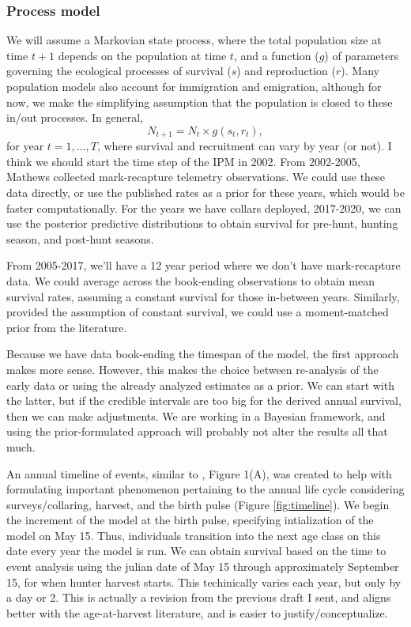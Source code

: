 \documentclass[12pt]{article}\usepackage[]{graphicx}\usepackage[]{color}
\begin{document}
\subsubsection{Process model}
We will assume a Markovian state process, where the total population size at time $t+1$ depends on the population at time $t$, and a function ($g$) of parameters governing the ecological processes of survival ($s$) and reproduction ($r$). Many population models also account for immigration and emigration, although for now, we make the simplifying assumption that the population is closed to these in/out processes. In general,
\begin{equation}
N_{t+1} = N_t \times g(s_t,r_t),
\end{equation} 
\noindent for year $t = 1,...,T$, where survival and recruitment can vary by year (or not). I think we should start the time step of the IPM in 2002. From 2002-2005, Mathews collected mark-recapture telemetry observations. We could use these data directly, or use the published rates as a prior for these years, which would be faster computationally. For the years we have collars deployed, 2017-2020, we can use the posterior predictive distributions to obtain survival for pre-hunt, hunting season, and post-hunt seasons. 

From 2005-2017, we'll have a 12 year period where we don't have mark-recapture data. We could average across the book-ending observations to obtain mean survival rates, assuming a constant survival for those in-between years. Similarly, provided the assumption of constant survival, we could use a moment-matched prior from the literature. 

Because we have data book-ending the timespan of the model, the first approach makes more sense. However, this makes the choice between re-analysis of the early data or using the already analyzed estimates as a prior. We can start with the latter, but if the credible intervals are too big for the derived annual survival, then we can make adjustments. We are working in a Bayesian framework, and using the prior-formulated approach will probably not alter the results all that much.

An annual timeline of events, similar to \citet{fieberg2010}, Figure 1(A), was created to help with formulating important phenomenon pertaining to the annual life cycle considering surveys/collaring, harvest, and the birth pulse (Figure \ref{fig:timeline}). We begin the increment of the model at the birth pulse, specifying intialization of the model on May 15. Thus, individuals transition into the next age class on this date every year the model is run. We can obtain survival based on the time to event analysis using the julian date of May 15 through approximately September 15, for when hunter harvest starts. This techinically varies each year, but only by a day or 2. This is actually a revision from the previous draft I sent, and aligns better with the age-at-harvest literature, and is easier to justify/conceptualize.
\end{document}
